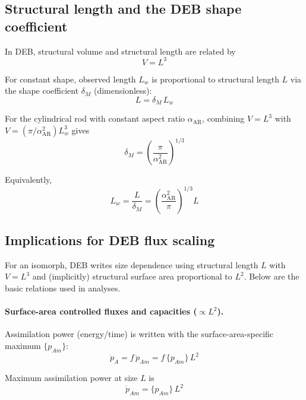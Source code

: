 \documentclass[11pt]{article}
\begin{document}
\subsection*{Structural length and the DEB shape coefficient}

In DEB, structural volume and structural length are related by
\begin{equation}
  V = L^3
\end{equation}

For constant shape, observed length $L_w$ is proportional to structural length $L$ via the shape coefficient $\delta_M$ (dimensionless):
\begin{equation}
  L = \delta_M\,L_w
\end{equation}

For the cylindrical rod with constant aspect ratio $\alpha_{\mathrm{AR}}$, combining $V=L^3$ with $V=(\pi/\alpha_{\mathrm{AR}}^2)L_w^3$ gives
\begin{equation}
  \delta_M = \left(\frac{\pi}{\alpha_{\mathrm{AR}}^2}\right)^{1/3}
\end{equation}

Equivalently,
\begin{equation}
  L_w = \frac{L}{\delta_M} = \left(\frac{\alpha_{\mathrm{AR}}^2}{\pi}\right)^{1/3} L
\end{equation}

\subsection*{Implications for DEB flux scaling}

For an isomorph, DEB writes size dependence using structural length $L$ with $V=L^3$ and (implicitly) structural surface area proportional to $L^2$. Below are the basic relations used in analyses.

\paragraph{Surface-area controlled fluxes and capacities ($\propto L^2$).}

Assimilation power (energy/time) is written with the surface-area-specific maximum $\{p_{Am}\}$:
\begin{equation}
  \dot p_A = f\,\dot p_{Am} = f\,\{p_{Am}\}\,L^2
\end{equation}

Maximum assimilation power at size $L$ is
\begin{equation}
  \dot p_{Am} = \{p_{Am}\}\,L^2
\end{equation}
\end{document}
